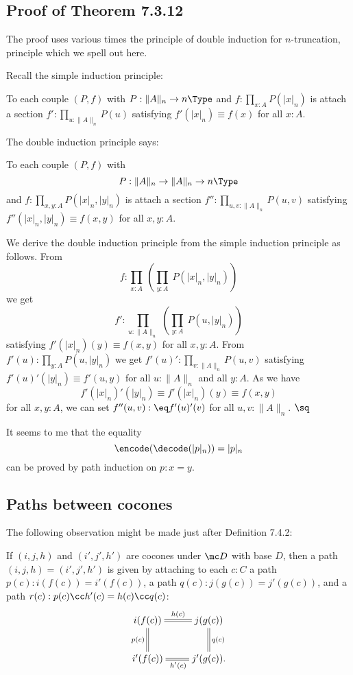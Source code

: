 \documentclass[12pt]{article}
\begin{document}

\subsection{Proof of Theorem 7.3.12}

The proof uses various times the principle of double induction for $n$-truncation, principle which we spell out here.

Recall the simple induction principle:

To each couple $(P,f)$ with $P:\lVert A\rVert_n\to n\Type$ and $f:\prod_{x:A}P(\lvert x\rvert_n)$ is attach a section $f':\prod_{u:\lVert A\rVert_n}P(u)$ satisfying $f'(\lvert x\rvert_n)\equiv f(x)$ for all $x:A$.

The double induction principle says:

To each couple $(P,f)$ with $$P:\lVert A\rVert_n\to\lVert A\rVert_n\to n\Type$$ and $f:\prod_{x,y:A}P(\lvert x\rvert_n,\lvert y\rvert_n)$ is attach a section $f'':\prod_{u,v:\lVert A\rVert_n}P(u,v)$ satisfying $f''(\lvert x\rvert_n,\lvert y\rvert_n)\equiv f(x,y)$ for all $x,y:A$.

We derive the double induction principle from the simple induction principle as follows. From 
$$
f:\prod_{x:A}\ \left(\prod_{y:A}\ P(\lvert x\rvert_n,\lvert y\rvert_n)\right)
$$ 
we get 
$$
f':\prod_{u:\lVert A\rVert_n}\ \left(\prod_{y:A}\ P(u,\lvert y\rvert_n)\right)
$$ 
satisfying $f'(\lvert x\rvert_n)(y)\equiv f(x,y)$ for all $x,y:A$. From $f'(u):\prod_{y:A}P(u,\lvert y\rvert_n)$ we get $f'(u)':\prod_{v:\lVert A\rVert_n}P(u,v)$ satisfying $f'(u)'(\lvert y\rvert_n)\equiv f'(u,y)$ for all $u:\lVert A\rVert_n$ and all $y:A$. As we have 
$$
f'(\lvert x\rvert_n)'(\lvert y\rvert_n)\equiv f'(\lvert x\rvert_n)(y)\equiv f(x,y) 
$$ 
for all $x,y:A$, we can set $f''(u,v):\eq f'(u)'(v)$ for all $u,v:\lVert A\rVert_n$. $\sq$

It seems to me that the equality 
$$
\encode(\decode(\lvert p\rvert_n))=\lvert p\rvert_n
$$ 
can be proved by path induction on $p:x=y$.


\subsection{Paths between cocones}\label{742}

The following observation might be made just after Definition 7.4.2: 

If $(i,j,h)$ and $(i',j',h')$ are cocones under $\mc D$ with base $D$, then a path $(i,j,h)=(i',j',h')$ is given by attaching to each $c:C$ a path $p(c):i(f(c))=i'(f(c))$, a path $q(c):j(g(c))=j'(g(c))$, and a path $r(c):p(c)\cc h'(c)=h(c)\cc q(c)$: 
$$
\xymatrix{
i(f(c))\ar@{=}[r]^{h(c)}\ar@{=}[d]_{p(c)}&j(g(c))\ar@{=}[d]^{q(c)}\\ 
i'(f(c))\ar@{=}[r]_{h'(c)}&j'(g(c)).}
$$
\end{document}
